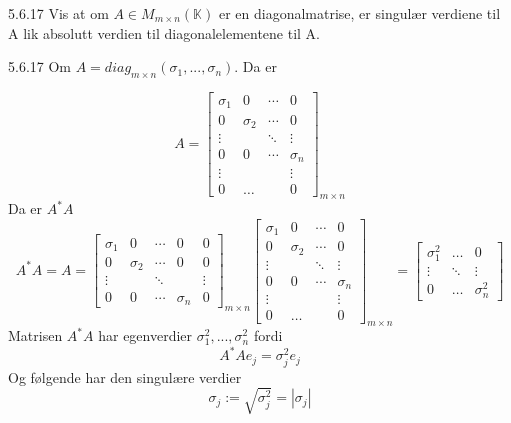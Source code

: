 \documentclass[a4paper,norsk]{article}
\begin{document}
\begin{oppgavebox}{5.6.17}{}
Vis at om $ A \in M_{m \times n}(\mathbb{K}) $ er en diagonalmatrise, er singulær verdiene til A lik absolutt verdien til diagonalelementene til A. 
\begin{proofbox}{5.6.17}{}
Om $ A = diag_{m \times n} \left( \sigma _{ 1} , ..., \sigma _{ n}  \right)  $. Da er 

\[
    A =
    \begin{bmatrix}
    \sigma _{ 1}  & 0      & \cdots & 0      \\
    0      & \sigma _{ 2}  & \cdots & 0      \\
    \vdots &        & \ddots & \vdots        \\
    0      & 0      & \cdots & \sigma _{ n}\\
    \vdots &        &        & \vdots \\
    0      & \hdots &        & 0
    \end{bmatrix}_{m \times n}
\]
Da er $ A^* A $ 
\[
    A^* A =
    A =
    \begin{bmatrix}
    \sigma _{ 1}  & 0      & \cdots & 0      & 0 \\
    0      & \sigma _{ 2}  & \cdots & 0      & 0 \\
    \vdots &        & \ddots &        & \vdots \\
    0      & 0      & \cdots & \sigma _{ n}  & 0
    \end{bmatrix}_{m \times n}
    \begin{bmatrix}
    \sigma _{ 1}  & 0      & \cdots & 0      \\
    0      & \sigma _{ 2}  & \cdots & 0      \\
    \vdots &        & \ddots & \vdots        \\
    0      & 0      & \cdots & \sigma _{ n}\\
    \vdots &        &        & \vdots \\
    0      & \hdots &        & 0
    \end{bmatrix}_{m \times n} = \begin{bmatrix}
        \sigma _{ 1} ^2 & \hdots & 0\\
        \vdots & \ddots & \vdots\\
        0 & \hdots & \sigma _{ n} ^2
    \end{bmatrix} 
\]
Matrisen $ A^*A $ har egenverdier $ \sigma _{ 1}^2, ...,   \sigma _{ n} ^2 $ fordi 
\[
    A^* A e_j = \sigma _{ j}^2 e_j
\]
Og følgende har den singulære verdier 
\[
    \sigma _{ j} := \sqrt{ \sigma _{ j} ^2 }= \left| \sigma _{ j}  \right| 
\]
\end{proofbox}
\end{oppgavebox}
\end{document}
